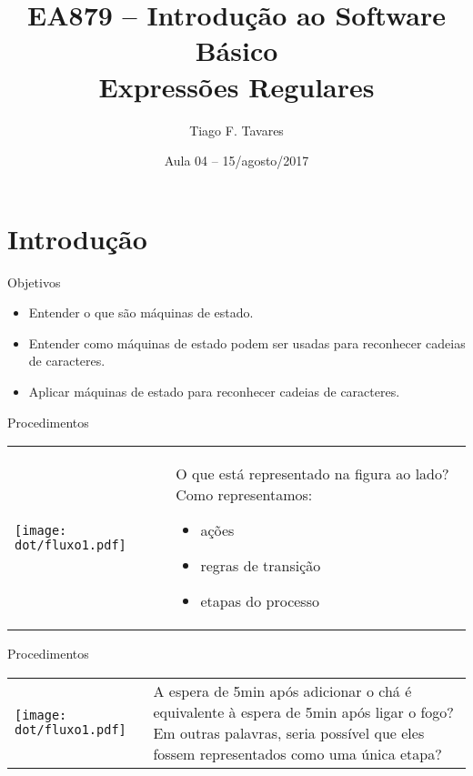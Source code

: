 \documentclass{beamer}
\title[04-Expressões Regulares]{EA879 -- Introdução ao Software Básico\\Expressões Regulares}
\author{Tiago F. Tavares}
\institute{FEEC -- UNICAMP}
\date{Aula 04 -- 15/agosto/2017}
\begin{document}
\begin{frame}
  \titlepage
\end{frame}


\section{Introdução}

\begin{frame}{Objetivos}
  \Large
  \begin{itemize}
    \item Entender o que são máquinas de estado.
    \item Entender como máquinas de estado podem ser usadas para reconhecer
      cadeias de caracteres.
    \item Aplicar máquinas de estado para reconhecer cadeias de caracteres.
  \end{itemize}
\end{frame}

\begin{frame}{Procedimentos}
  \centering
  \begin{tabular}{l m{6cm}}
    \begin{minipage}{.3\textwidth}
  \texttt{[image: dot/fluxo1.pdf]}
    \end{minipage}
  &
  O que está representado na figura ao lado? Como representamos:
    \begin{itemize}
  \item ações
  \item regras de transição
  \item etapas do processo
    \end{itemize}
  \\
  \end{tabular}
\end{frame}

\begin{frame}{Procedimentos}
  \centering
  \Large
  \begin{tabular}{l m{6cm}}
    \begin{minipage}{.3\textwidth}
  \texttt{[image: dot/fluxo1.pdf]}
    \end{minipage}
  &
    A espera de 5min após adicionar o chá é equivalente à espera de 5min após
    ligar o fogo? Em outras palavras, seria possível que eles fossem
    representados como uma única etapa?
    \\
  \end{tabular}
\end{frame}
\end{document}
